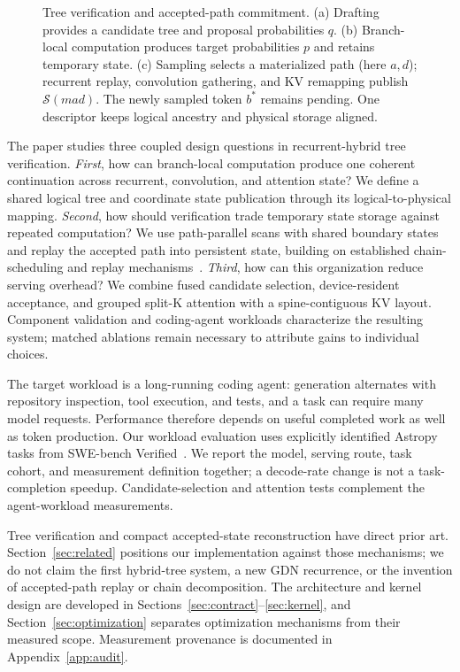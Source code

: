 \documentclass[conference]{IEEEtran}
\begin{document}
\begin{figure}[t]
\centering
\resizebox{\textwidth}{!}{}
\caption{Tree verification and accepted-path commitment. (a) Drafting provides a candidate tree and proposal probabilities $q$. (b) Branch-local computation produces target probabilities $p$ and retains temporary state. (c) Sampling selects a materialized path (here $a,d$); recurrent replay, convolution gathering, and KV remapping publish $\mathcal{S}(mad)$. The newly sampled token $b^*$ remains pending. One descriptor keeps logical ancestry and physical storage aligned.}
\label{fig:pipeline}
\end{figure}

The paper studies three coupled design questions in recurrent-hybrid tree verification. \textit{First}, how can branch-local computation produce one coherent continuation across recurrent, convolution, and attention state? We define a shared logical tree and coordinate state publication through its logical-to-physical mapping. \textit{Second}, how should verification trade temporary state storage against repeated computation? We use path-parallel scans with shared boundary states and replay the accepted path into persistent state, building on established chain-scheduling and replay mechanisms~\cite{wang2026specla,oda2026marginals}. \textit{Third}, how can this organization reduce serving overhead? We combine fused candidate selection, device-resident acceptance, and grouped split-K attention with a spine-contiguous KV layout. Component validation and coding-agent workloads characterize the resulting system; matched ablations remain necessary to attribute gains to individual choices.

The target workload is a long-running coding agent: generation alternates with repository inspection, tool execution, and tests, and a task can require many model requests. Performance therefore depends on useful completed work as well as token production. Our workload evaluation uses explicitly identified Astropy tasks from SWE-bench Verified~\cite{jimenez2024swe}. We report the model, serving route, task cohort, and measurement definition together; a decode-rate change is not a task-completion speedup. Candidate-selection and attention tests complement the agent-workload measurements.

Tree verification and compact accepted-state reconstruction have direct prior art. Section~\ref{sec:related} positions our implementation against those mechanisms; we do not claim the first hybrid-tree system, a new GDN recurrence, or the invention of accepted-path replay or chain decomposition. The architecture and kernel design are developed in Sections~\ref{sec:contract}--\ref{sec:kernel}, and Section~\ref{sec:optimization} separates optimization mechanisms from their measured scope. Measurement provenance is documented in Appendix~\ref{app:audit}.
\end{document}
